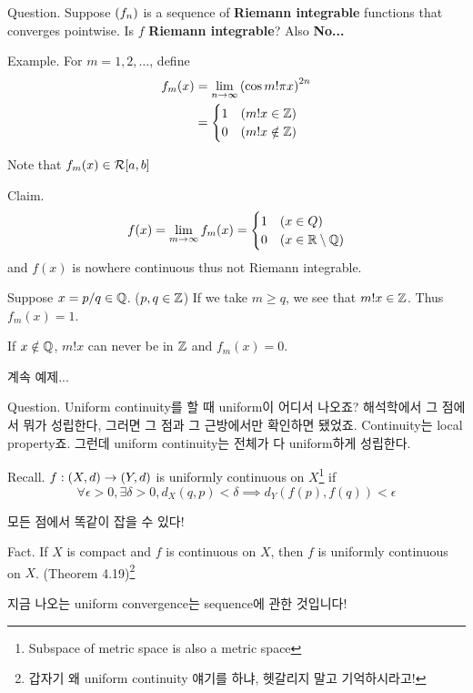 Question. Suppose \(\left( f_n \right)\) is a sequence of \textbf{Riemann integrable} functions that converges pointwise. Is \(f\) \textbf{Riemann integrable}? Also \textbf{No...}

Example. For \(m = 1, 2, \dots\), define
\[
\begin{aligned}
    f_m(x) &= \lim_{n\rightarrow \infty} \left(\cos m! \pi x\right)^{2n} \\
    &= \begin{cases}
        1 & (m!x \in \mathbb{Z}) \\
        0 & (m!x \notin \mathbb{Z})
    \end{cases}
\end{aligned}
\]

Note that \(f_m(x) \in \mathcal{R}[a, b]\)

Claim. \[
    f(x) = \lim_{m\rightarrow \infty} f_m(x) = \begin{cases}
        1 & (x\in Q) \\
        0 & (x \in \mathbb{R} \setminus \mathbb{Q})
    \end{cases}
\]
and \(f(x)\) is nowhere continuous thus not Riemann integrable.

\begin{pf}
    Suppose \(x = p/q \in \mathbb{Q}\). (\(p, q\in \mathbb{Z}\)) If we take \(m \geq q\), we see that \(m! x \in \mathbb{Z}\). Thus \(f_m(x) = 1\).

    If \(x \notin \mathbb{Q}\), \(m! x\) can never be in \(\mathbb{Z}\) and \(f_m(x) = 0\).
\end{pf}

계속 예제...

Question. Uniform continuity를 할 때 uniform이 어디서 나오죠? 해석학에서 그 점에서 뭐가 성립한다, 그러면 그 점과 그 근방에서만 확인하면 됐었죠. Continuity는 local property죠. 그런데 uniform continuity는 전체가 다 uniform하게 성립한다.

Recall. \(f: (X, d) \rightarrow (Y, d)\) is uniformly continuous on \(X\)\footnote{Subspace of metric space is also a metric space} if
\[
    \forall \epsilon > 0, \exists \delta > 0, d_X(q, p) < \delta \implies d_Y(f(p), f(q)) < \epsilon
\]

모든 점에서 똑같이 잡을 수 있다!

Fact. If \(X\) is compact and \(f\) is continuous on \(X\), then \(f\) is uniformly continuous on \(X\). (Theorem 4.19)\footnote{갑자기 왜 uniform continuity 얘기를 하냐, 헷갈리지 말고 기억하시라고!}

지금 나오는 uniform convergence는 sequence에 관한 것입니다!

